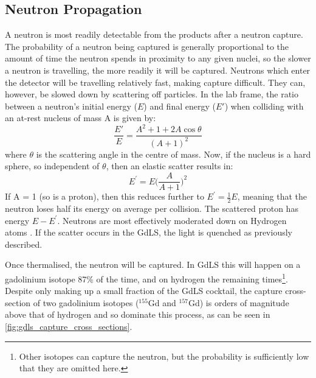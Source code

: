 

\subsection{Neutron Propagation}
\par
A neutron is most readily detectable from the products after a neutron capture.
The probability of a neutron being captured is generally proportional to the amount of time the neutron spends in proximity to any given nuclei, so the slower a neutron is travelling, the more readily it will be captured.
Neutrons which enter the detector will be travelling relatively fast, making capture difficult.
They can, however, be slowed down by scattering off particles.
In the lab frame, the ratio between a neutron's initial energy ($E$) and final energy ($E'$) when colliding with an at-rest nucleus of mass A is given by:
\begin{equation}
    \frac{E'}{E} = \frac{A^2 + 1 + 2A\cos{\theta}}{(A + 1)^2}
\end{equation}
where $\theta$ is the scattering angle in the centre of mass.
Now, if the nucleus is a hard sphere, so independent of $\theta$, then an elastic scatter results in:
\begin{equation}
    E^{'} = E\bigg(\frac{A}{A+1}\bigg)^{2}
\end{equation}
If A = 1 (so is a proton), then this reduces further to $E^{'} = \frac{1}{2}E$, meaning that the neutron loses half its energy on average per collision.
The scattered proton has energy $E - E^{'}$.
Neutrons are most effectively moderated down on Hydrogen atoms \cite{neutron_thermalisation_and_capture_ref}.
If the scatter occurs in the GdLS, the light is quenched as previously described.
\par
Once thermalised, the neutron will be captured.
In GdLS this will happen on a gadolinium isotope 87\% of the time, and on hydrogen the remaining times\footnote{Other isotopes can capture the neutron, but the probability is sufficiently low that they are omitted here.}.
Despite only making up a small fraction of the GdLS cocktail, the capture cross-section of two gadolinium isotopes (${}^{155}$Gd and ${}^{157}$Gd) is orders of magnitude above that of hydrogen and so dominate this process, as can be seen in \autoref{fig:gdls_capture_cross_sections}.



